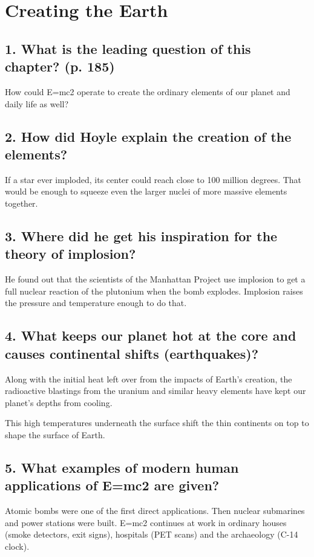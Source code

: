 %
\newpage
\section{Creating the Earth}

\subsection*{1. What is the leading question of this chapter? (p. 185)}
How could E=mc2 operate to create the ordinary elements of our planet and daily life as well?

\subsection*{2. How did Hoyle explain the creation of the elements?}
If a star ever imploded, its center could reach close to 100 million degrees. That would be enough to squeeze even the larger nuclei of more massive elements together.

\subsection*{3. Where did he get his inspiration for the theory of implosion?}
He found out that the scientists of the Manhattan Project use implosion to get a full nuclear reaction of the plutonium when the bomb explodes. Implosion raises the pressure and temperature enough to do that.

\subsection*{4. What keeps our planet hot at the core and causes continental shifts (earthquakes)?}
Along with the initial heat left over from the impacts of Earth's creation, the radioactive blastings from the uranium and similar heavy elements have kept our planet's depths from cooling.

This high temperatures underneath the surface shift the thin continents on top to shape the surface of Earth.

\subsection*{5. What examples of modern human applications of E=mc2 are given?}
Atomic bombs were one of the first direct applications. Then nuclear submarines and power stations were built. E=mc2 continues at work in ordinary houses (smoke detectors, exit signs), hospitals (PET scans) and the archaeology (C-14 clock).